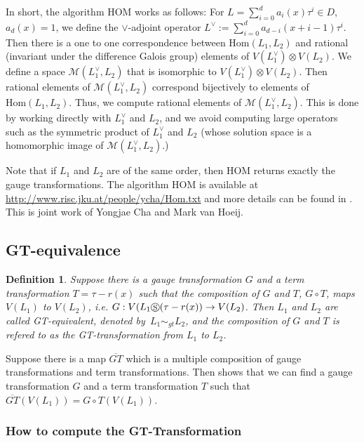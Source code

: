 \documentclass{article}
\newtheorem{definition}[theorem]{Definition}
\newcommand{\Hom}{\mathrm{Hom}}
\newcommand{\cS}{\circledS}
\begin{document}
In short, the algorithm HOM works as follows: For $L=\sum_{i=0}^d a_i(x)\tau^i \in D$,
$a_d(x)=1$, we define the $\vee$-adjoint operator $L^\vee:=\sum_{i=0}^d
a_{d-i}(x+i-1)\tau^i$.  Then there is a one to one correspondence between $\Hom(L_1, L_2)$
and rational (invariant under the difference Galois group) elements of $V(L_1^\vee)
\otimes V(L_2)$.  We define a space $\mathcal{M}(L_1^\vee, L_2)$ that is isomorphic to
$V(L_1^\vee) \otimes V(L_2)$.  Then rational elements of $\mathcal{M}(L_1^\vee, L_2)$
correspond bijectively to elements of $\Hom(L_1, L_2)$. Thus, we compute rational elements
of $\mathcal{M}(L_1^\vee, L_2)$.  This is done by working directly with $L_1^\vee$ and
$L_2$, and we avoid computing large operators such as the symmetric product of $L_1^\vee$
and $L_2$ (whose solution space is a homomorphic image of $\mathcal{M}(L_1^\vee, L_2)$.)

Note that if $L_1$ and $L_2$ are of the same order, then HOM returns exactly the gauge
transformations. The algorithm HOM is available at
\url{http://www.risc.jku.at/people/ycha/Hom.txt} and more details can be found in \cite{TensorRatSol}. This is joint work of Yongjae Cha and Mark van Hoeij.

\subsection{GT-equivalence}

\begin{definition}
  Suppose there is a gauge transformation $G$ and a term transformation $T=\tau-r(x)$ such that the
  composition of $G$ and $T$, $G \circ T$, maps $V(L_1)$ to $V(L_2)$, i.e. 
   $G:  V(L_1 \cS (\tau-r(x))  \rightarrow V(L_2)$.  
  Then $L_1$ and $L_2$ are called GT-equivalent, denoted by~$L_1 \sim_{gt}
  L_2$, and the composition of $G$ and $T$ is refered to as the GT-transformation from
  $L_1$ to $L_2$.
\end{definition}



Suppose there is a map $\overline{GT}$ which is a multiple composition of gauge transformations and term transformations. Then 
\cite[Theorem 3.3.]{Le10} shows that we can find a gauge transformation $G$ and a term transformation $T$ such that
$\overline{GT}(V(L_1))=G\circ T( V(L_1))$.



\subsubsection{How to compute the GT-Transformation}
\end{document}
